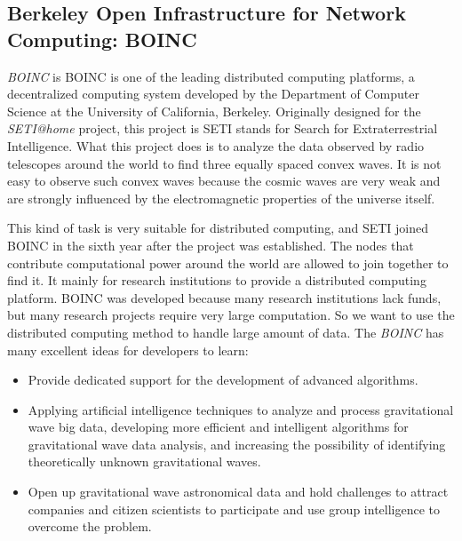 \documentclass[11pt]{book}
\begin{document}
\subsection{Berkeley Open Infrastructure for Network Computing: BOINC}
\textit{BOINC} is BOINC is one of the leading distributed computing platforms, 
a decentralized computing system developed by the Department of Computer Science at the University of California, Berkeley. 
Originally designed for the \textit{SETI@home} project, this project is 
SETI stands for Search for Extraterrestrial Intelligence. What this project does is to analyze the data observed by radio telescopes around the world to find three equally spaced convex waves. It is not easy to observe such convex waves because the cosmic waves are very weak and are strongly influenced by the electromagnetic properties of the universe itself.

This kind of task is very suitable for distributed computing, and SETI joined BOINC in the sixth year after the project was established. The nodes that contribute computational power around the world are allowed to join together to find it.
It mainly for research institutions to provide a distributed computing platform. BOINC was developed because many research institutions lack funds, but many research projects require very large computation. So we want to use the distributed computing method to handle large amount of data.
The \textit{BOINC} has many excellent ideas for developers to learn:
\begin{itemize}
	\item Provide dedicated support for the development of advanced algorithms.
 \item Applying artificial intelligence techniques to analyze and process gravitational wave big data, developing more efficient and intelligent algorithms for gravitational wave data analysis, and increasing the possibility of identifying theoretically unknown gravitational waves.
 \item Open up gravitational wave astronomical data and hold challenges to attract companies and citizen scientists to participate and use group intelligence to overcome the problem.
\end{itemize}
\end{document}
